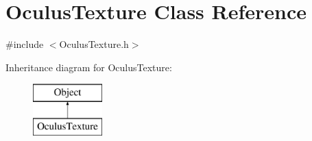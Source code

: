 \hypertarget{class_oculus_texture}{}\section{Oculus\+Texture Class Reference}
\label{class_oculus_texture}


{\ttfamily \#include $<$Oculus\+Texture.\+h$>$}

Inheritance diagram for Oculus\+Texture\+:\begin{figure}[H]
\begin{center}
\leavevmode
\includegraphics[height=2.000000cm]{class_oculus_texture}
\end{center}
\end{figure}

